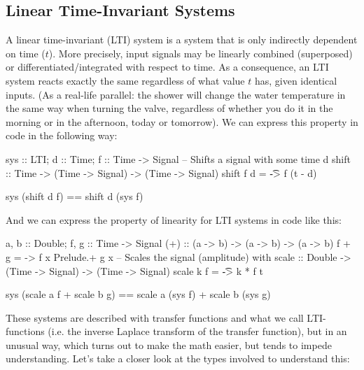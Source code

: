 \begin{newtext}
\subsection{Linear Time-Invariant Systems}\label{sec:ltisprimer}
A linear time-invariant (LTI) system is a system that is only indirectly dependent on time ($t$). More precisely, input signals may be linearly combined (superposed) or differentiated/integrated with respect to time.
As a consequence, an LTI system reacts exactly the same regardless of what value $t$ has, given identical inputs. (As a real-life parallel: the shower will change the water temperature in the same way when turning the valve, regardless of whether you do it in the morning or in the afternoon, today or tomorrow). We can express this property in code in the following way:
\begin{codeeq}
sys :: LTI; d :: Time; f :: Time -> Signal
-- Shifts a signal with some time d
shift :: Time -> (Time -> Signal) -> (Time -> Signal)
shift f d = \t -> f (t - d)
\end{codeeq}
\begin{codeeq}
sys (shift d f) == shift d (sys f)
\end{codeeq}
And we can express the property of linearity for LTI systems in code like this:
\begin{codeeq}
a, b :: Double; f, g :: Time -> Signal
(+) :: (a -> b) -> (a -> b) -> (a -> b)
f + g = \x -> f x Prelude.+ g x
-- Scales the signal (amplitude) with
scale :: Double -> (Time -> Signal) -> (Time -> Signal)
scale k f = \t -> k * f t
\end{codeeq}
\begin{codeeq}
sys (scale a f + scale b g) 
    == scale a (sys f) + scale b (sys g)
\end{codeeq}
These systems are described with transfer functions and what we call LTI-functions (i.e. the inverse Laplace transform of the transfer function), but in an unusual way, which turns out to make the math easier, but tends to impede understanding. Let's take a closer look at the types involved to understand this:
\end{newtext}

